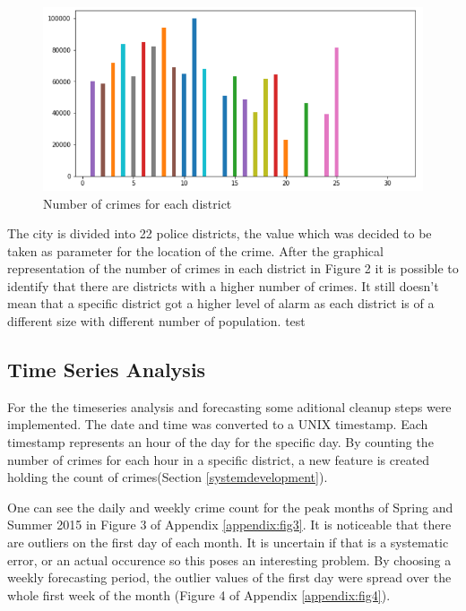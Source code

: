 \documentclass[a4paper, twocolumn]{article}
\begin{document}
\begin{figure}
    \includegraphics[scale=0.3]{fig2.png}
    \caption{Number of crimes for each district}
\end{figure}
The city is divided into 22 police districts, the value which was decided to be taken as parameter for the location of the crime.
After the graphical representation of the number of crimes in each district in Figure 2
it is possible to identify that there are districts with a higher number of crimes. 
It still doesn’t mean that a specific district got a higher level of alarm as each district is of a different size with different number of population. 
test

\subsection{Time Series Analysis}
For the the timeseries analysis and forecasting some aditional cleanup steps were implemented. 
The date and time was converted to a UNIX timestamp. 
Each timestamp represents an hour of the day for the specific day.
By counting the number of crimes for each hour in a specific district, a new feature is created holding the count of crimes(Section \ref{systemdevelopment}).

One can see the daily and weekly crime count for the peak months of Spring and Summer 2015 
in Figure 3 of Appendix \ref{appendix:fig3}. 
It is noticeable that there are outliers on the first day of each month. 
It is uncertain if that is a systematic error, or an actual occurence so this poses an interesting problem. 
By choosing a weekly forecasting period, the outlier values of the first day were spread over the whole first week of the month (Figure 4 of Appendix \ref{appendix:fig4}).
\end{document}
